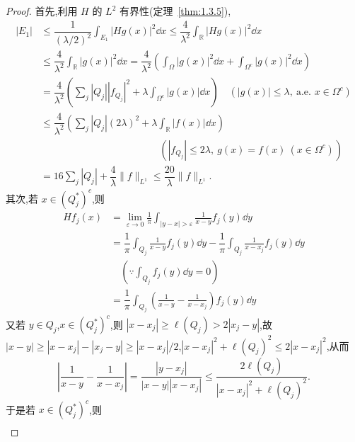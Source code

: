 \begin{proof}
首先,利用 $H$ 的 $L^{2}$ 有界性(定理~\ref{thm:1.3.5}),
\begin{align*}
|E_{1}| &\leq \dfrac{1}{(\lambda/2)^{2}}\displaystyle\int_{E_{1}}|Hg(x)|^{2}\dd x \leq \dfrac{4}{\lambda^{2}}\displaystyle\int_{\mathbb{R}}|Hg(x)|^{2}\dd x \\
\quad &\leq \dfrac{4}{\lambda^{2}}\displaystyle\int_{\mathbb{R}}|g(x)|^{2}\dd x = \dfrac{4}{\lambda^{2}}\left(\displaystyle\int_{\Omega}|g(x)|^{2}\dd x + \displaystyle\int_{\Omega^{c}}|g(x)|^{2}\dd x\right) \\
\quad &= \dfrac{4}{\lambda^{2}}\left(\displaystyle\sum_{j}|Q_{j}||f_{Q_{j}}|^{2} + \lambda\displaystyle\int_{\Omega^{c}}|g(x)|\dd x\right) \quad (|g(x)| \leq \lambda,\ \text{a.e. } x \in \Omega^{c}) \\
\quad &\leq \dfrac{4}{\lambda^{2}}\left(\displaystyle\sum_{j}|Q_{j}|(2\lambda)^{2} + \lambda\displaystyle\int_{\mathbb{R}}|f(x)|\dd x\right) \\
&\quad \quad \quad \quad \quad \quad \quad \quad \quad \quad \quad \quad (|f_{Q_{j}}| \leq 2\lambda,\ g(x) = f(x)\ (x \in \Omega^{c})) \\
&= 16\displaystyle\sum_{j}|Q_{j}| + \dfrac{4}{\lambda}\| f \|_{L^{1}} \leq \dfrac{20}{\lambda}\| f \|_{L^{1}}.
\end{align*}
其次,若 $x \in (Q_{j}^{*})^{c}$,则
\begin{align*}
Hf_{j}(x) & = \displaystyle\lim_{\varepsilon \to 0}\frac{1}{\pi}\int_{|y - x| > \varepsilon}\frac{1}{x - y}f_{j}(y)\dd y \\
& = \dfrac{1}{\pi}\displaystyle\int_{Q_{j}}\frac{1}{x - y}f_{j}(y)\dd y - \dfrac{1}{\pi}\int_{Q_{j}}\frac{1}{x - x_{j}}f_{j}(y)\dd y \\
& \quad \left(\because \displaystyle\int_{Q_{j}} f_{j}(y)\dd y = 0\right) \\
& = \dfrac{1}{\pi}\displaystyle\int_{Q_{j}}\left(\frac{1}{x - y} - \frac{1}{x - x_{j}}\right)f_{j}(y)\dd y
\end{align*}
又若 $y \in Q_{j}$,$x \in (Q_{j}^{*})^{c}$,则 $|x - x_{j}| \geq \ell(Q_{j}) > 2|x_{j} - y|$,故 $|x - y| \geq |x - x_{j}| - |x_{j} - y| \geq |x - x_{j}|/2$,$|x - x_{j}|^{2} + \ell(Q_{j})^{2} \leq 2|x - x_{j}|^{2}$,从而
\begin{equation*}
\left|\frac{1}{x - y} - \frac{1}{x - x_{j}}\right| = \frac{|y - x_{j}|}{|x - y||x - x_{j}|} \leq \frac{2\ell(Q_{j})}{|x - x_{j}|^{2} + \ell(Q_{j})^{2}}.
\end{equation*}
于是若 $x \in (Q_{j}^{*})^{c}$,则
\begin{align*}

\end{align*}
\end{proof}
